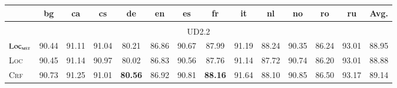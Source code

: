 \begin{table*}[tb]
    \setlength{\tabcolsep}{3.3pt}
    \centering
    \begin{tabularx}{\textwidth}{lccccccccccccc}
        \toprule
                                      & bg             & ca             & cs                               & de                              & en                              & es                               & fr                              & it                               & nl                               & no                              & ro                               & ru                               & Avg.                             \\[1pt]
        \hline
        \\[-15pt]
        \multicolumn{14}{c}{UD2.2}                                                                                                                                                                                                                                                                                                                                                                                                                                   \\[1pt]
        $\textsc{Loc}_{\textsc{mst}}$ & 90.44          & 91.11          & 91.04                            & 80.21                           & 86.86                           & 90.67                            & 87.99                           & 91.19                            & 88.24                            & 90.35                           & 86.24                            & 93.01                            & 88.95                            \\
        \textsc{Loc}                  & 90.45          & 91.14          & 90.97                            & 80.02                           & 86.83                           & 90.56                            & 87.76                           & 91.14                            & 87.72                            & 90.74                           & 86.20                            & 93.01                            & 88.88                            \\
        \textsc{Crf}                  & 90.73          & 91.25          & 91.01                            & \textbf{80.56}\rlap{$^\dagger$} & 86.92                           & 90.81\rlap{$^\dagger$}           & \textbf{88.16}                  & 91.64\rlap{$^\dagger$}           & 88.10                            & 90.85                           & 86.50                            & 93.17\rlap{$^\dagger$}           & 89.14\rlap{$^\ddagger$}          \\

\end{tabularx}
\end{table*}

